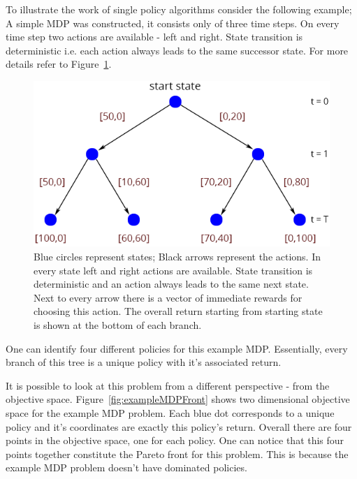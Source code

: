 To illustrate the work of single policy algorithms consider the following example; A simple MDP was constructed, it consists only of three time steps. On every time step two actions are available - left and right. State transition is deterministic i.e. each action always leads to the same successor state. For more details refer to Figure~\ref{fig:decisionTree}.

\begin{figure}[ht]
\centering
\includegraphics[scale=0.6]{decisionTree.png}
\caption{Blue circles represent states; Black arrows represent the actions. In every state left and right actions are available. State transition is deterministic and an action always leads to the same next state. Next to every arrow there is a vector of immediate rewards for choosing this action. The overall return starting from starting state is shown at the bottom of each branch.}
\label{fig:decisionTree}
\end{figure}

One can identify four different policies for this example MDP. Essentially, every branch of this tree is a unique policy with it's associated return.

It is possible to look at this problem from a different perspective - from the objective space. Figure~\ref{fig:exampleMDPFront} shows two dimensional objective space for the example MDP problem. Each blue dot corresponds to a unique policy and it's coordinates are exactly this policy's return. Overall there are four points in the objective space, one for each policy. One can notice that this four points together constitute the Pareto front for this problem. This is because the example MDP problem doesn't have dominated policies.

